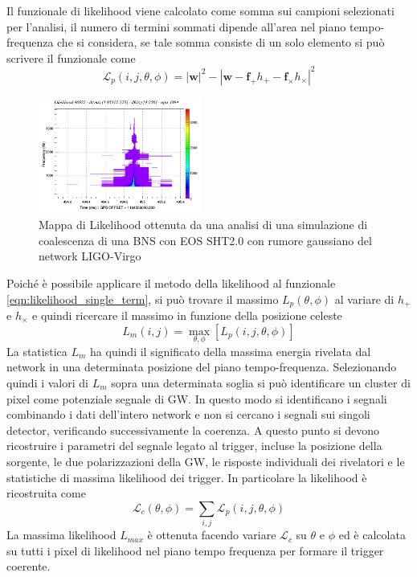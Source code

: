 Il funzionale di likelihood viene calcolato come somma sui campioni selezionati per l'analisi, il numero di termini sommati dipende all'area nel piano tempo-frequenza che si considera, se tale somma consiste di un solo elemento si può scrivere il funzionale come
\begin{equation}
	\mathcal{L}_p(i,j,\theta,\phi)=|\mathbf{w}|^2 -|\mathbf{w} - \mathbf{f}_+h_+ - \mathbf{f}_\times h_\times|^2
	\label{eqn:likelihood_single_term}
\end{equation}

\begin{figure}
	\vspace{-25pt}
	\begin{center}
		\includegraphics[width=0.475\textwidth]{figures/Capitolo_3/l_tfmap_scalogram.png}
	\end{center}
	\vspace{-5pt}
	\caption{Mappa di Likelihood ottenuta da una analisi di una simulazione di coalescenza di una BNS con EOS SHT2.0 con rumore gaussiano del network LIGO-Virgo}
	\label{fig:Likelihood_example}
	\vspace{-10pt}
\end{figure}
Poiché è possibile applicare il metodo della likelihood al funzionale \ref{eqn:likelihood_single_term}, si può trovare il massimo $L_p(\theta, \phi)$ al variare di $h_+$ e $h_\times$ e quindi ricercare il massimo in funzione della posizione celeste
\begin{equation}
	L_m(i,j)= \max_{\theta, \phi}[L_p(i,j,\theta,\phi)]
	\label{eqn:max_L}
\end{equation}
La statistica $L_m$ ha quindi il significato della massima energia rivelata dal network in una determinata posizione del piano tempo-frequenza. Selezionando quindi i valori di $L_m$ sopra una determinata soglia si può identificare un cluster di pixel come potenziale segnale di GW. In questo modo si identificano i segnali combinando i dati dell'intero network e non si cercano i segnali sui singoli detector, verificando successivamente la coerenza.
A questo punto si devono ricostruire i parametri del segnale legato al trigger, incluse la posizione della sorgente, le due polarizzazioni della GW, le risposte individuali dei rivelatori e le statistiche di massima likelihood dei trigger. In particolare la likelihood è ricostruita come
\begin{equation}
	\mathcal{L}_c(\theta,\phi) = \sum_{i,j}\mathcal{L}_p(i,j,\theta, \phi)
\end{equation}
La massima likelihood $L_{max}$ è ottenuta facendo variare $\mathcal{L}_c$ su $\theta$ e $\phi$ ed è calcolata su tutti i pixel di likelihood nel piano tempo frequenza per formare il trigger coerente\cite{Klimenko_2008}.
